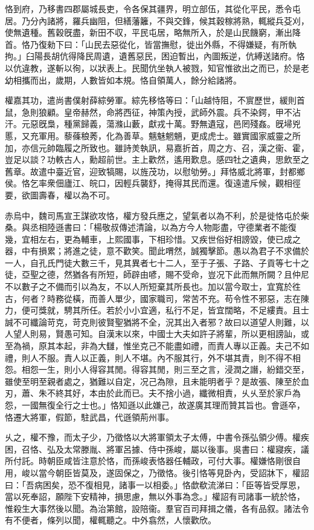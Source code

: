 \begin{pinyinscope}
恪到府，乃移書四郡屬城長吏，令各保其疆界，明立部伍，其從化平民，悉令屯居。乃分內諸將，羅兵幽阻，但繕藩籬，不與交鋒，候其穀稼將熟，輒縱兵芟刈，使無遺種。舊穀旣盡，新田不収，平民屯居，略無所入，於是山民饑窮，漸出降首。恪乃復勑下曰：「山民去惡從化，皆當撫慰，徙出外縣，不得嫌疑，有所執拘。」臼陽長胡伉得降民周遺，遺舊惡民，困迫暫出，內圖叛逆，伉縛送諸府。恪以伉違教，遂斬以徇，以狀表上。民聞伉坐執人被戮，知官惟欲出之而已，於是老幼相攜而出，歲期，人數皆如本規。恪自領萬人，餘分給諸將。

權嘉其功，遣尚書僕射薛綜勞軍。綜先移恪等曰：「山越恃阻，不賔歷世，緩則首鼠，急則狼顧。皇帝赫然，命將西征，神策內授，武師外震。兵不染鍔，甲不沾汗。元惡旣梟，種黨歸義，蕩滌山藪，獻戎十萬。野無遺寇，邑罔殘姦。旣埽兇慝，又充軍用。藜蓧稂莠，化為善草。魑魅魍魎，更成虎士。雖實國家威靈之所加，亦信元帥臨履之所致也。雖詩羙執訊，易嘉折首，周之方、召，漢之衞、霍，豈足以談？功軼古人，勳超前世。主上歡然，遙用歎息。感四牡之遺典，思飲至之舊章。故遣中臺近官，迎致犒賜，以旌茂功，以慰劬勞。」拜恪威北將軍，封都鄉侯。恪乞率衆佃廬江、皖口，因輕兵襲舒，掩得其民而還。復遠遣斥候，觀相徑要，欲圖壽春，權以為不可。

赤烏中，魏司馬宣王謀欲攻恪，權方發兵應之，望氣者以為不利，於是徙恪屯於柴桑。與丞相陸遜書曰：「楊敬叔傳述清論，以為方今人物彫盡，守德業者不能復幾，宜相左右，更為輔車，上熙國事，下相珍惜。又疾世俗好相謗毀，使已成之器，中有損累；將進之徒，意不歡笑。聞此喟然，誠獨擊節。愚以為君子不求備於一人，自孔氏門徒大數三千，見其異者七十二人，至于子張、子路、子貢等七十之徒，亞聖之德，然猶各有所短，師辟由喭，賜不受命，豈况下此而無所闕？且仲尼不以數子之不備而引以為友，不以人所短棄其所長也。加以當今取士，宜寬於徃古，何者？時務從橫，而善人單少，國家職司，常苦不充。苟令性不邪惡，志在陳力，便可獎就，騁其所任。若於小小宜適，私行不足，皆宜闊略，不足縷責。且士誠不可纖論苛克，苛克則彼賢聖猶將不全，況其出入者邪？故曰以道望人則難，以人望人則易，賢愚可知。自漢末以來，中國士大夫如許子將輩，所以更相謗訕，或至為禍，原其本起，非為大讎，惟坐克己不能盡如禮，而責人專以正義。夫己不如禮，則人不服。責人以正義，則人不堪。內不服其行，外不堪其責，則不得不相怨。相怨一生，則小人得容其閒。得容其閒，則三至之言，浸潤之譖，紛錯交至，雖使至明至親者處之，猶難以自定，况己為隙，且未能明者乎？是故張、陳至於血刃，蕭、朱不終其好，本由於此而已。夫不捨小過，纖微相責，乆乆至於家戶為怨，一國無復全行之士也。」恪知遜以此嫌己，故遂廣其理而贊其旨也。會遜卒，恪遷大將軍，假節，駐武昌，代遜領荊州事。

乆之，權不豫，而太子少，乃徵恪以大將軍領太子太傅，中書令孫弘領少傅。權疾困，召恪、弘及太常滕胤、將軍呂據、侍中孫峻，屬以後事。吳書曰：權寢疾，議所付託。時朝臣咸皆注意於恪，而孫峻表恪器任輔政，可付大事。權嫌恪剛很自用，峻以當今朝臣皆莫及，遂固保之，乃徵恪。後引恪等見卧內，受詔牀下，權詔曰：「吾病困矣，恐不復相見，諸事一以相委。」恪歔欷流涕曰：「臣等皆受厚恩，當以死奉詔，願陛下安精神，損思慮，無以外事為念。」權詔有司諸事一統於恪，惟殺生大事然後以聞。為治第館，設陪衞。羣官百司拜揖之儀，各有品叙。諸法令有不便者，條列以聞，權輒聽之。中外翕然，人懷歡欣。


\end{pinyinscope}
